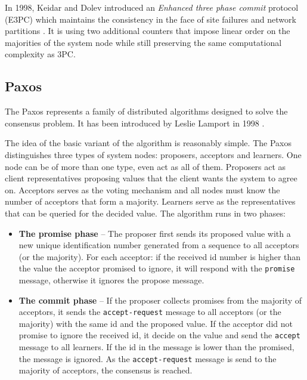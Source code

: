 \documentclass[oneside,
  digital, %
  table,   %
  nolof,     %
  nolot,     %
]{fithesis3}
\begin{document}
In 1998, Keidar and Dolev introduced an \textit{Enhanced three phase commit} protocol (E3PC) which maintains the consistency in the face of site failures and network partitions \cite{E3PC}. It is using two additional counters that impose linear order on the majorities of the system node while still preserving the same computational complexity as 3PC. 


\subsection{Paxos}

The Paxos represents a family of distributed algorithms designed to solve the consensus problem. It has been introduced by Leslie Lamport in 1998 \cite{Paxos}.

The idea of the basic variant of the algorithm is reasonably simple. The Paxos distinguishes three types of system nodes: proposers, acceptors and learners. One node can be of more than one type, even act as all of them. Proposers act as client representatives proposing values that the client wants the system to agree on. Acceptors serves as the voting mechanism and all nodes must know the number of acceptors that form a majority. Learners serve as the representatives that can be queried for the decided value. The algorithm runs in two phases:

\begin{itemize}
    \item \textbf{The promise phase} -- The proposer first sends its proposed value with a new unique identification number generated from a sequence to all acceptors (or the majority). For each acceptor: if the received id number is higher than the value the acceptor promised to ignore, it will respond with the \texttt{promise} message, otherwise it ignores the propose message.
    
    \item \textbf{The commit phase} -- If the proposer collects promises from the majority of acceptors, it sends the \texttt{accept-request} message to all acceptors (or the majority) with the same id and the proposed value. If the acceptor did not promise to ignore the received id, it decide on the value and send the \texttt{accept} message to all learners. If the id in the message is lower than the promised, the message is ignored. As the \texttt{accept-request} message is send to the majority of acceptors, the consensus is reached.
\end{itemize}
\end{document}
